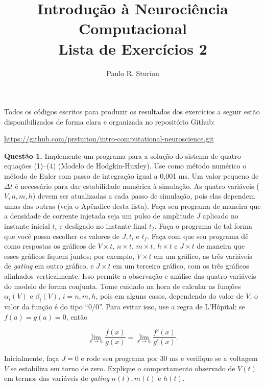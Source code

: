 \documentclass[english,11pt,a4paper]{article}
\title{Introdução à Neurociência Computacional\\Lista de Exercícios 2}
\author{Paulo R. Sturion}
\begin{document}
	\maketitle
	
	\noindent Todos os códigos escritos para produzir os resultados dos exercícios a seguir estão disponibilizados de forma clara e organizada no repositório Github:
	
	\begin{center}
		\noindent \href{https://github.com/prsturion/intro-computational-neurosciene.git}{https://github.com/prsturion/intro-computational-neuroscience.git} \newline
	\end{center}
	
	\noindent \textbf{Questão 1.} Implemente um programa para a solução do sistema de quatro equações (1)--(4) (Modelo de Hodgkin-Huxley). Use como método numérico o método de Euler com passo de integração igual a 0,001 ms. Um valor pequeno de $\Delta t$ é necessário para dar estabilidade numérica à simulação. As quatro variáveis ($V, n, m, h$) devem ser atualizadas a cada passo de simulação, pois elas dependem umas das outras (veja o Apêndice desta lista). Faça seu programa de maneira que a densidade de corrente injetada seja um pulso de amplitude $J$ aplicado no instante inicial $t_i$ e desligado no instante final $t_f$. Faça o programa de tal forma que você possa escolher os valores de $J, t_i$ e $t_f$. Faça com que seu programa dê como respostas os gráficos de $V \times t$, $n \times t$, $m \times t$, $h \times t$ e $J \times t$ de maneira que esses gráficos fiquem juntos; por exemplo, $V \times t$ em um gráfico, as três variáveis de \textit{gating} em outro gráfico, e $J \times t$ em um terceiro gráfico, com os três gráficos alinhados verticalmente. Isso permite a observação e análise das quatro variáveis do modelo de forma conjunta. Tome cuidado na hora de calcular as funções $\alpha_i(V)$ e $\beta_i(V)$, $i = n, m, h$, pois em alguns casos, dependendo do valor de $V$, o valor da função é do tipo ``0/0''. Para evitar isso, use a regra de L'Hôpital: se $f(a) = g(a) = 0$, então
	
	\[
	\lim_{x \to a} \frac{f(x)}{g(x)} = \lim_{x \to a} \frac{f'(x)}{g'(x)}.
	\]
	
	\noindent Inicialmente, faça $J = 0$ e rode seu programa por 30 ms e verifique se a voltagem $V$ se estabiliza em torno de zero. Explique o comportamento observado de $V(t)$ em termos das variáveis de \textit{gating} $n(t), m(t)$ e $h(t)$.
	\\\\
	
\end{document}

